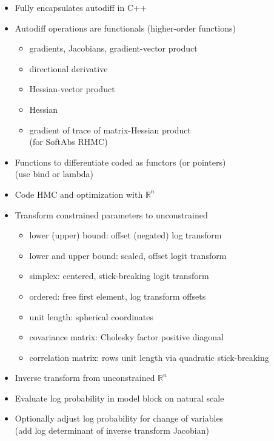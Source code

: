 \documentclass[10pt]{report}
\newcommand{\sld}[1]{\newpage{\noindent\LARGE \ \ \
    \textcolor{MidnightBlue}{\bfseries #1}}\vspace*{4pt}}
\newcommand{\myemph}[1]{{\color{MidnightBlue}{\bfseries #1}}}
\begin{document}
\sld{Autodiff Functionals}

\begin{itemize}
\item Fully encapsulates autodiff in C++
\item Autodiff operations are functionals {\footnotesize (higher-order functions)}
\begin{itemize}\small
\item gradients, Jacobians, gradient-vector product
\item directional derivative
\item Hessian-vector product
\item Hessian
\item gradient of trace of matrix-Hessian product
\\ {\footnotesize (for SoftAbs RHMC)}
\end{itemize}
\item Functions to differentiate coded as functors (or pointers)
\\ {\footnotesize (use bind or lambda)}
\end{itemize}

\sld{Variable Transforms}
\begin{itemize}
\item Code HMC and optimization with $\mathbb{R}^n$ \myemph{support}
\item Transform constrained parameters to unconstrained
\vspace*{-2pt}
{\small
\begin{itemize}
\item lower (upper) bound: offset (negated) log transform
\item lower and upper bound: scaled, offset logit transform
\item simplex: centered, stick-breaking logit transform
\item ordered: free first element, log transform offsets
\item unit length: spherical coordinates
\item covariance matrix: Cholesky factor positive diagonal 
\item correlation matrix: rows unit length via quadratic stick-breaking
\end{itemize}
}
\end{itemize}


\sld{Variable Transforms (cont.)}
\begin{itemize}
\item Inverse transform from unconstrained $\mathbb{R}^n$
\item Evaluate log probability in model block on natural scale
\item Optionally adjust log probability for change of variables
\\ {\footnotesize (add log determinant of inverse transform Jacobian)}
\end{itemize}
\end{document}
